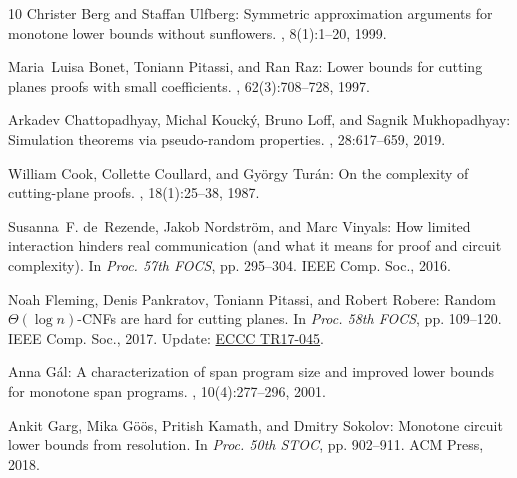 \documentclass[11pt]{article}
\numberwithin{equation}{section}
\theoremstyle{definition}
\theoremstyle{plain}
\begin{document}
\begin{thebibliography}{10}
{\sc Christer Berg and Staffan Ulfberg}: Symmetric approximation arguments for
  monotone lower bounds without sunflowers.
, 8(1):1--20, 1999.
\newblock [\epfmtdoi{10.1007/s000370050017}]

{\sc Maria~Luisa Bonet, Toniann Pitassi, and Ran Raz}: Lower bounds for cutting
  planes proofs with small coefficients.
, 62(3):708--728, 1997.
\newblock [\epfmtdoi{10.2307/2275569}]

{\sc Arkadev Chattopadhyay, Michal Kouck{\'{y}}, Bruno Loff, and Sagnik
  Mukhopadhyay}: Simulation theorems via pseudo-random properties.
, 28:617--659, 2019.

{\sc William Cook, Collette Coullard, and Gy{\"o}rgy Tur{\'a}n}: On the
  complexity of cutting-plane proofs.
, 18(1):25--38, 1987.
\newblock [\epfmtdoi{10.1016/0166-218X(87)90039-4}]

{\sc Susanna~F. de~Rezende, Jakob Nordstr{\"o}m, and Marc Vinyals}: How limited
  interaction hinders real communication (and what it means for proof and
  circuit complexity).
\newblock In {\em Proc. 57th FOCS}, pp. 295--304. IEEE Comp. Soc., 2016.

{\sc Noah Fleming, Denis Pankratov, Toniann Pitassi, and Robert Robere}: Random
  {$\Theta(\log n)$}-{CNF}s are hard for cutting planes.
\newblock In {\em Proc. 58th FOCS}, pp. 109--120. IEEE Comp. Soc., 2017.
\newblock Update: \href{https://eccc.weizmann.ac.il/report/2017/045/}{ECCC
  TR17-045}.

{\sc Anna G{\'a}l}: A characterization of span program size and improved lower
  bounds for monotone span programs.
, 10(4):277--296, 2001.
\newblock [\epfmtdoi{10.1007/s000370100001}]

{\sc Ankit Garg, Mika G\"{o}\"{o}s, Pritish Kamath, and Dmitry Sokolov}:
  Monotone circuit lower bounds from resolution.
\newblock In {\em Proc. 50th STOC}, pp. 902--911. ACM Press, 2018.
\newblock [\epfmtdoi{10.1145/3188745.3188838}]


\end{thebibliography}
\end{document}
